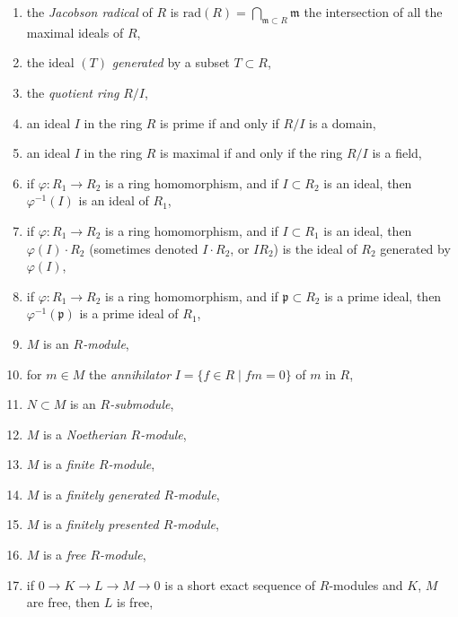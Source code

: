 \begin{enumerate}
\item
\label{item-jacobson-radical}
the {\it Jacobson radical} of $R$ is $\text{rad}(R) =
\bigcap_{\mathfrak m \subset R} \mathfrak m$ the intersection
of all the maximal ideals of $R$,
\item the ideal $(T)$ {\it generated} by a subset $T \subset R$,
\label{item-ideal-generated-by}
\item the {\it quotient ring} $R/I$,
\label{item-quotient-ring}
\item an ideal $I$ in the ring $R$ is prime if and only if $R/I$ is a domain,
\label{item-characterize-prime-ideal}
\item
\label{item-characterize-maximal-ideal}
an ideal $I$ in the ring $R$ is maximal if and only if the
ring $R/I$ is a field,
\item
\label{item-inverse-image-ideal}
if $\varphi : R_1 \to R_2$ is a ring homomorphism, and if
$I \subset R_2$ is an ideal, then $\varphi^{-1}(I)$ is an
ideal of $R_1$,
\item
\label{item-image-ideal}
if $\varphi : R_1 \to R_2$ is a ring homomorphism, and if
$I \subset R_1$ is an ideal, then $\varphi(I) \cdot R_2$ (sometimes
denoted $I \cdot R_2$, or $IR_2$) is the ideal of $R_2$ generated
by $\varphi(I)$,
\item
\label{item-inverse-image-prime}
if $\varphi : R_1 \to R_2$ is a ring homomorphism, and if
$\mathfrak p \subset R_2$ is a prime ideal, then
$\varphi^{-1}(\mathfrak p)$ is a prime ideal of $R_1$,
\item $M$ is an {\it $R$-module},
\label{item-module}
\item
\label{item-annihilator}
for $m \in M$ the {\it annihilator}
$I = \{f \in R \mid fm = 0\}$ of $m$ in $R$,
\item $N \subset M$ is an {\it $R$-submodule},
\label{item-submodule}
\item $M$ is a {\it Noetherian $R$-module},
\label{item-Noetherian-module}
\item $M$ is a {\it finite $R$-module},
\label{item-finite-module}
\item $M$ is a {\it finitely generated $R$-module},
\label{item-finitely-generated-module}
\item $M$ is a {\it finitely presented $R$-module},
\label{item-finitely-presented-module}
\item $M$ is a {\it free $R$-module},
\label{item-free-module}
\item
\label{item-extension-free}
if $0 \to K \to L \to M \to 0$ is a short exact sequence
of $R$-modules and $K$, $M$ are free, then $L$ is free,

\end{enumerate}
